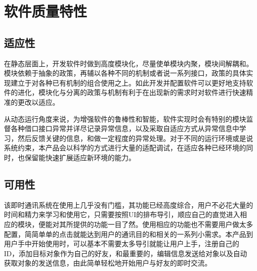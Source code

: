 \chapter{软件质量特性}





\section{适应性}
在静态层面上，开发软件时做到高度模块化，尽量使单模块内聚，模块间解耦和。模块依赖于抽象的政策，再辅以各种不同的机制或者说一系列接口，政策的具体实现建立于对各种已有机制的组合使用之上。如此开发并配置软件可以更好地支持软件的进化，模块化与分离的政策与机制有利于在出现新的需求时对软件进行快速精准的更改以适应。

从动态运行角度来说，为增强软件的鲁棒性和智能，软件实现时会有特别的模块监督各种借口接口异常并详尽记录异常信息，以及采取自适应方式从异常信息中学习，然后反馈关键的信息，和做一定程度的异常处理。对于不同的运行环境或是说系统约束，本产品会以科学的方式进行大量的适配调试，在适应各种已经环境的同时，也保留能快速扩展适应新环境的能力。

\section{可用性}
该即时通讯系统在使用上几乎没有门槛，其功能已经高度综合，用户不必花大量的时间和精力来学习和使用它，只需要按照UI的排布导引，顺应自己的直觉进入相应的模块，便能对其所提供的功能一目了然。使用相应的功能也不需要用户做太多配置，简简单单的点击就能达到用户的通讯目的和相关的一系列小需求。本产品到用户手中开始使用时，可以基本不需要太多导引就能让用户上手，注册自己的ID，添加目标对象作为自己的好友，和最重要的，编辑信息发送给对象以及自动获取对象的发送信息，由此简单轻松地开始用户与好友的即时交流。

